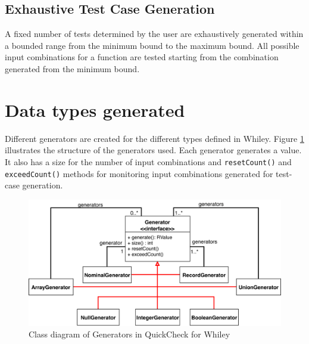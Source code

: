 \subsection{Exhaustive Test Case Generation}
A fixed number of tests determined by the user are exhaustively generated within a bounded range from the minimum bound to the maximum bound. All possible input combinations for a function are tested starting from the combination generated from the minimum bound.


\section{Data types generated}
Different generators are created for the different types defined in Whiley. 
Figure \ref{fig:qc-generators} illustrates the structure of the generators used.
Each generator generates a value. It also has a size for the number of input combinations and \texttt{resetCount()} and \texttt{exceedCount()} methods for monitoring input combinations generated for test-case generation.
 
\begin{figure}
	\caption{Class diagram of Generators in QuickCheck for Whiley}
	\label{fig:qc-generators}
	\includegraphics[width=\textwidth]{qc-generators}
	\centering
\end{figure}

